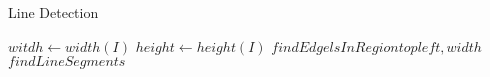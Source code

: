 \begin{algorithm}
	\caption{Line Detection}
	\label{src:analyseLineDetection}
	\begin{algorithmic}[1]
			\State $witdh \gets width\left(I\right)$
			\State $height \gets height\left(I\right)$
					\State $findEdgelsInRegion top left, width$
					\State $findLineSegments$
				\EndFor
			\EndFor
		\EndProcedure
	\end{algorithmic}
\end{algorithm}
